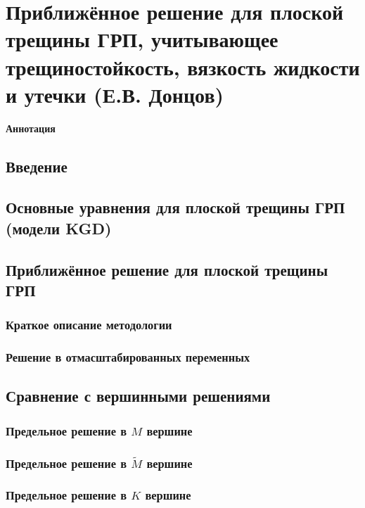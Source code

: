 \documentclass[main.tex]{subfiles}
\begin{document}
\section*{Приближённое решение для плоской трещины ГРП, учитывающее трещиностойкость, вязкость жидкости и утечки (Е.В. Донцов)}

\textbf{Аннотация}

\subsection{Введение}

\subsection{Основные уравнения для плоской трещины ГРП (модели KGD)}

\subsection{Приближённое решение для плоской трещины ГРП}

\subsubsection{Краткое описание методологии}

\subsubsection{Решение в отмасштабированных переменных}

\subsection{Сравнение с вершинными решениями}

\subsubsection{Предельное решение в $M$ вершине}

\subsubsection{Предельное решение в $\tilde{M}$ вершине}

\subsubsection{Предельное решение в $K$ вершине}
\end{document}

